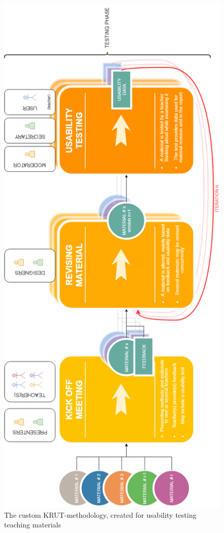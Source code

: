\begin{figure}
\centering
\includegraphics[scale=0.6,angle=-90]{figure/krut.png}
\vspace*{2cm}
\caption{The custom KRUT-methodology, created for usability testing teaching materials}
\label{krut}
\end{figure}

